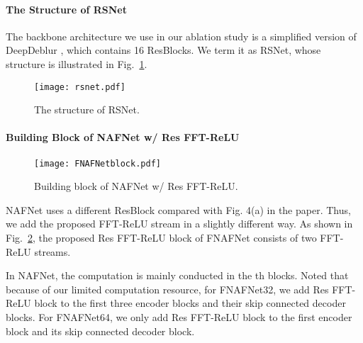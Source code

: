 \documentclass[letterpaper]{article} \usepackage{aaai23}  \usepackage{times}  \usepackage{helvet}  \usepackage{courier}  \usepackage[hyphens]{url}  \usepackage{graphicx} \usepackage{enumitem}
\begin{document}
\paragraph{The Structure of RSNet}

The backbone architecture we use in our ablation study is a simplified version of DeepDeblur \cite{Nah2017deep}, which contains 16 ResBlocks. We term it as RSNet, whose structure is illustrated in Fig.~\ref{fig:rsnet}.

\begin{figure}[h]
\begin{center}
    \texttt{[image: rsnet.pdf]}
\end{center}
\caption{The structure of RSNet.} 
\label{fig:rsnet}
\end{figure}

\paragraph{Building Block of NAFNet w/ Res FFT-ReLU}

\begin{figure}[t]
\begin{center}
    \texttt{[image: FNAFNetblock.pdf]}
\end{center}
\caption{Building block of NAFNet w/ Res FFT-ReLU.} 
\label{fig:nafnetblock}
\end{figure}

NAFNet \cite{Chen2022simple} uses a different ResBlock compared with Fig. 4(a) in the paper. Thus, we add the proposed FFT-ReLU stream in a slightly different way. As shown in Fig.~\ref{fig:nafnetblock}, the proposed Res FFT-ReLU block of FNAFNet consists of two FFT-ReLU streams.

In NAFNet, the computation is mainly conducted in the th blocks. Noted that because of our limited computation resource, for FNAFNet32, we add Res FFT-ReLU block to the first three encoder blocks and their skip connected decoder blocks. For FNAFNet64, we only add Res FFT-ReLU block to the first encoder block and its skip connected decoder block. 
\end{document}
